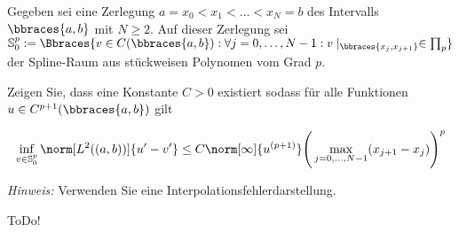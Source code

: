 
\begin{exercise}

Gegeben sei eine Zerlegung $a = x_0 < x_1 < \dots < x_N = b$ des Intervalls
$\bbraces{a,b}$ mit $N \geq 2$. Auf dieser Zerlegung sei
$\mathbb{S}_0^p := \Bbraces{v \in C(\bbraces{a,b}): \forall j = 0, \dots, N-1 : v\mid_{\bbraces{x_j , x_{j+1}}} \in \prod_p}$
der Spline-Raum aus stückweisen Polynomen vom Grad $p$.

Zeigen Sie, dass eine Konstante $C>0$ existiert sodass für alle Funktionen
$u \in C^{p+1}(\bbraces{a,b})$ gilt

\begin{align}
  \inf_{v\in \mathbb{S}^p_0} \norm[L^2((a,b))]{u' - v'}
  \leq C \norm[\infty]{u^{(p+1)}} \Bigg( \max_{j=0, \dots, N-1} (x_{j+1} - x_j)\Bigg)^p
\end{align}

\textit{Hinweis:} Verwenden Sie eine Interpolationsfehlerdarstellung.
\end{exercise}


\begin{solution}

ToDo!

\end{solution}

